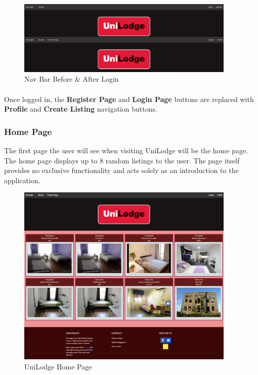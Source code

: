 \begin{figure}[H]
	\caption{Nav Bar Before \& After Login}
	\label{image:home}
	\centering
	\includegraphics[width=0.93\textwidth]{images/navbar.png}
\end{figure}

\paragraph{}
Once logged in, the \textbf{Register Page} and \textbf{Login Page} buttons are replaced with \textbf{Profile} and \textbf{Create Listing} navigation buttons.

\subsubsection{Home Page}
The first page the user will see when visiting UniLodge will be the home page. The home page displays up to 8 random listings to the user. The page itself provides no exclusive functionality and acts solely as an introduction to the application. 

\begin{figure}[H]
	\caption{UniLodge Home Page}
	\label{image:home}
	\centering
	\includegraphics[width=0.93\textwidth]{images/home.png}
\end{figure}	

